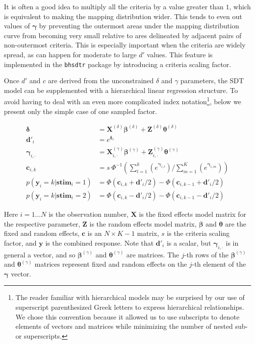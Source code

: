 \documentclass[a4paper,man,apacite,floatsintext]{apa6}
\newcommand{\code}[1]{\texttt{#1}}
\begin{document}
It is often a good idea to multiply all the criteria by a value
greater than $1$, which is equivalent to making the mapping
distribution wider. This tends to even out values of $\bm{\gamma}$ by
preventing the outermost areas under the mapping distribution curve
from becoming very small relative to ares delineated by adjacent pairs
of non-outermost criteria. This is especially important when the
criteria are widely spread, as can happen for moderate to large $d'$
values. This feature is implemented in the \code{bhsdtr} package by
introducing a criteria scaling factor.

Once $d'$ and $c$ are derived from the unconstrained $\delta$ and
$\gamma$ parameters, the SDT model can be supplemented with a
hierarchical linear regression structure. To avoid having to deal with
an even more complicated index notation\footnote{The reader familiar
  with hierarchical models may be surprised by our use of superscript
  parenthesized Greek letters to express hierarchical
  relationships. We chose this convention because it allowed us to use
  subscripts to denote elements of vectors and matrices while
  minimizing the number of nested sub- or superscripts.}, below we
present only the simple case of one sampled factor.

\begin{align*}
  \bm{\delta} &= \bm{X}^{(\delta)} \bm{\beta}^{(\delta)} + \bm{Z}^{(\delta)} \bm{\theta}^{(\delta)} \\
  \bm{d'}_i &= e^{\bm{\delta}_i} \\
  \bm{\gamma}_{i,\cdot} &= \bm{X}^{(\gamma)}_{i,\cdot} \bm{\beta}^{(\gamma)} + \bm{Z}^{(\gamma)}_{i,\cdot}
                      \bm{\theta}^{(\gamma)} \\
  \bm{c}_{i,k} &= s \ \Phi^{-1}(\sum_{l = 1}^k(e^{\bm{\gamma}_{i,l}}) /
                 \sum_{m=1}^K(e^{\bm{\gamma}_{i,m}})) \\
  p(\bm{y}_i = k|\bm{stim}_i = 1) &= \Phi(\bm{c}_{i,k} + \bm{d'}_i / 2) - \Phi(\bm{c}_{i,k-1} + \bm{d'}_i / 2) \\
  p(\bm{y}_i = k|\bm{stim}_i = 2) &= \Phi(\bm{c}_{i,k} - \bm{d'}_i / 2) - \Phi(\bm{c}_{i,k-1} - \bm{d'}_i / 2)
\end{align*}

\noindent Here $i = 1\dots N$ is the observation number, $\bm{X}$ is
the fixed effects model matrix for the respective parameter, $\bm{Z}$
is the random effects model matrix, $\bm{\beta}$ and $\bm{\theta}$ are
the fixed and random effects, $\bm{c}$ is an $N \times K-1$ matrix,
$s$ is the criteria scaling factor, and $\bm{y}$ is the combined
response. Note that $\bm{d'}_i$ is a scalar, but
$\bm{\gamma}_{i,\cdot}$ is in general a vector, and so
$\bm{\beta}^{(\gamma)}$ and $\bm{\theta}^{(\gamma)}$ are matrices. The
$j$-th rows of the $\bm{\beta}^{(\gamma)}$ and
$\bm{\theta}^{(\gamma)}$ matrices represent fixed and random effects
on the $j$-th element of the $\bm{\gamma}$ vector.
\end{document}
